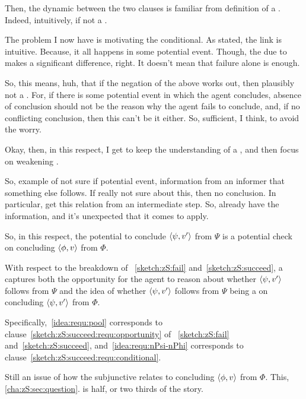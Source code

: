 \begin{note}[\requ{3}]
{    Then, the dynamic between the two clauses is familiar from definition of a \fc{}.
    Indeed, intuitively, if not a \fc{}.
  }

  {
    \color{green}
    The problem I now have is motivating the conditional.
    As stated, the link is intuitive.
    Because, it all happens in some potential event.
    Though, the due to makes a significant difference, right.
    It doesn't mean that failure alone is enough.

    So, this means, huh, that if the negation of the above works out, then plausibly not a \requ{}.
    For, if there is some potential event in which the agent concludes, absence of conclusion should not be the reason why the agent fails to conclude, and, if no conflicting conclusion, then this can't be it either.
    So, sufficient, I think, to avoid the worry.

    Okay, then, in this respect, I get to keep the understanding of a \requ{}, and then focus on weakening \qzS{}.

    So, example of not sure if potential event, information from an informer that something else follows.
    If really not sure about this, then no conclusion.
    In particular, get this relation from an intermediate step.
    So, already have the information, and it's unexpected that it comes to apply.
  }

  {
    \color{red}
    So, in this respect, the potential to conclude \(\langle \psi, v' \rangle\) from \(\Psi\) is a potential check on concluding \(\langle \phi, v \rangle\) from \(\Phi\).
  }

  With respect to the breakdown of ~\ref{sketch:zS:fail} and~\ref{sketch:zS:succeed}, a \requ{} captures both the opportunity for the agent to reason about whether \(\langle \psi, v' \rangle\) follows from \(\Psi\) and the idea of whether \(\langle \psi, v' \rangle\) follows from \(\Psi\) being a  on concluding \(\langle \psi, v' \rangle\) from \(\Phi\).

  Specifically,~\ref{idea:requ:pool} corresponds to clause~\ref{sketch:zS:succeed:requ:opportunity} of ~\ref{sketch:zS:fail} and~\ref{sketch:zS:succeed}, and~\ref{idea:requ:nPsi-nPhi} corresponds to clause~\ref{sketch:zS:succeed:requ:conditional}.

  Still an issue of how the subjunctive relates to concluding \(\langle \phi, v \rangle\) from \(\Phi\).
  This, \autoref{cha:zS:sec:question}.
  \requ{} is half, or two thirds of the story.
\end{note}

